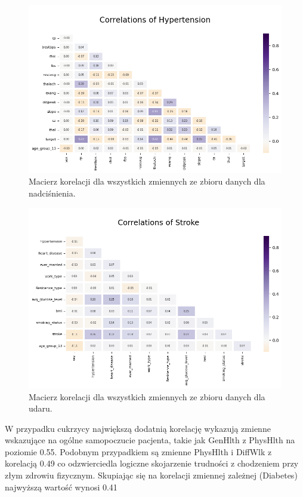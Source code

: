 \documentclass[onecolumn,12pt]{article}
\begin{document}
\begin{figure}[H]
    \centering
    \includegraphics[width=0.85\linewidth]{raport/graphs/hypertension_corr.png}
    \captionsetup{justification=centering}
    \caption{Macierz korelacji dla wszystkich zmiennych ze zbioru danych dla nadciśnienia.}
    \label{fig:enter-label}
\end{figure}

\begin{figure}[H]
    \centering
    \includegraphics[width=0.85\linewidth]{raport/graphs/stroke_corr.png}
    \captionsetup{justification=centering}
    \caption{Macierz korelacji dla wszystkich zmiennych ze zbioru danych dla udaru.}
    \label{fig:enter-label}
\end{figure}

\newpage
\noindent
W przypadku cukrzycy największą dodatnią korelację wykazują zmienne wskazujące na ogólne samopoczucie pacjenta, takie jak GenHlth z PhysHlth na poziomie 0.55. Podobnym przypadkiem są zmienne PhysHlth i DiffWlk z korelacją 0.49 co odzwierciedla logiczne skojarzenie trudności z chodzeniem przy złym zdrowiu fizycznym. Skupiając się na korelacji zmiennej zależnej (Diabetes) najwyższą wartość wynosi 0.41
\end{document}
